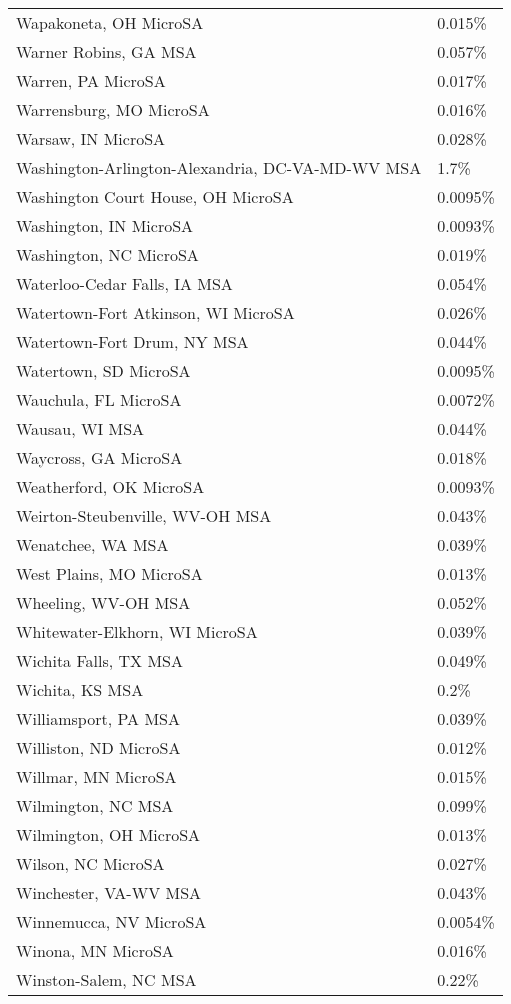 \begin{longtable}[]{@{}ll@{}}
Wapakoneta, OH MicroSA & 0.015\% \\
Warner Robins, GA MSA & 0.057\% \\
Warren, PA MicroSA & 0.017\% \\
Warrensburg, MO MicroSA & 0.016\% \\
Warsaw, IN MicroSA & 0.028\% \\
Washington-Arlington-Alexandria, DC-VA-MD-WV MSA & 1.7\% \\
Washington Court House, OH MicroSA & 0.0095\% \\
Washington, IN MicroSA & 0.0093\% \\
Washington, NC MicroSA & 0.019\% \\
Waterloo-Cedar Falls, IA MSA & 0.054\% \\
Watertown-Fort Atkinson, WI MicroSA & 0.026\% \\
Watertown-Fort Drum, NY MSA & 0.044\% \\
Watertown, SD MicroSA & 0.0095\% \\
Wauchula, FL MicroSA & 0.0072\% \\
Wausau, WI MSA & 0.044\% \\
Waycross, GA MicroSA & 0.018\% \\
Weatherford, OK MicroSA & 0.0093\% \\
Weirton-Steubenville, WV-OH MSA & 0.043\% \\
Wenatchee, WA MSA & 0.039\% \\
West Plains, MO MicroSA & 0.013\% \\
Wheeling, WV-OH MSA & 0.052\% \\
Whitewater-Elkhorn, WI MicroSA & 0.039\% \\
Wichita Falls, TX MSA & 0.049\% \\
Wichita, KS MSA & 0.2\% \\
Williamsport, PA MSA & 0.039\% \\
Williston, ND MicroSA & 0.012\% \\
Willmar, MN MicroSA & 0.015\% \\
Wilmington, NC MSA & 0.099\% \\
Wilmington, OH MicroSA & 0.013\% \\
Wilson, NC MicroSA & 0.027\% \\
Winchester, VA-WV MSA & 0.043\% \\
Winnemucca, NV MicroSA & 0.0054\% \\
Winona, MN MicroSA & 0.016\% \\
Winston-Salem, NC MSA & 0.22\% \\

\end{longtable}
